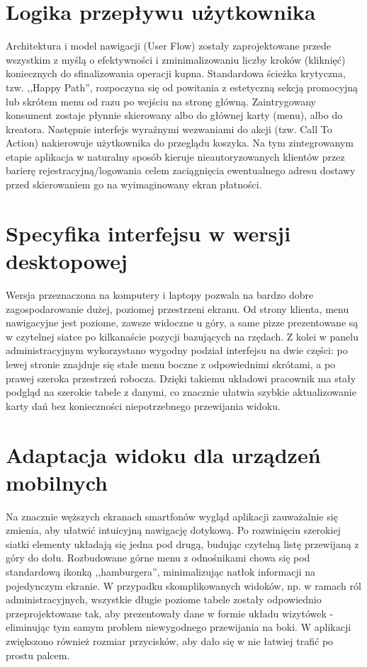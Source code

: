 \section{Logika przepływu użytkownika}

Architektura i model nawigacji (User Flow) zostały zaprojektowane przede wszystkim z myślą o efektywności i zminimalizowaniu liczby kroków (kliknięć) koniecznych do sfinalizowania operacji kupna. Standardowa ścieżka krytyczna, tzw. ,,Happy Path'', rozpoczyna się od powitania z estetyczną sekcją promocyjną lub skrótem menu od razu po wejściu na stronę główną. Zaintrygowany konsument zostaje płynnie skierowany albo do głównej karty (menu), albo do kreatora. Następnie interfejs wyraźnymi wezwaniami do akcji (tzw. Call To Action) nakierowuje użytkownika do przeglądu koszyka. Na tym zintegrowanym etapie aplikacja w naturalny sposób kieruje nieautoryzowanych klientów przez barierę rejestracyjną/logowania celem zaciągnięcia ewentualnego adresu dostawy przed skierowaniem go na wyimaginowany ekran płatności.

\section{Specyfika interfejsu w wersji desktopowej}

Wersja przeznaczona na komputery i laptopy pozwala na bardzo dobre zagospodarowanie dużej, poziomej przestrzeni ekranu. Od strony klienta, menu nawigacyjne jest poziome, zawsze widoczne u góry, a same pizze prezentowane są w czytelnej siatce po kilkanaście pozycji bazujących na rzędach. Z kolei w panelu administracyjnym wykorzystano wygodny podział interfejsu na dwie części: po lewej stronie znajduje się stałe menu boczne z odpowiednimi skrótami, a po prawej szeroka przestrzeń robocza. Dzięki takiemu układowi pracownik ma stały podgląd na szerokie tabele z danymi, co znacznie ułatwia szybkie aktualizowanie karty dań bez konieczności niepotrzebnego przewijania widoku.

\section{Adaptacja widoku dla urządzeń mobilnych}

Na znacznie węższych ekranach smartfonów wygląd aplikacji zauważalnie się zmienia, aby ułatwić intuicyjną nawigację dotykową. Po rozwinięciu szerokiej siatki elementy układają się jedna pod drugą, budując czytelną listę przewijaną z góry do dołu. Rozbudowane górne menu z odnośnikami chowa się pod standardową ikonką ,,hamburgera'', minimalizując natłok informacji na pojedynczym ekranie. W przypadku skomplikowanych widoków, np. w ramach ról administracyjnych, wszystkie długie poziome tabele zostały odpowiednio przeprojektowane tak, aby prezentowały dane w formie układu wizytówek - eliminując tym samym problem niewygodnego przewijania na boki. W aplikacji zwiększono również rozmiar przycisków, aby dało się w nie łatwiej trafić po prostu palcem.